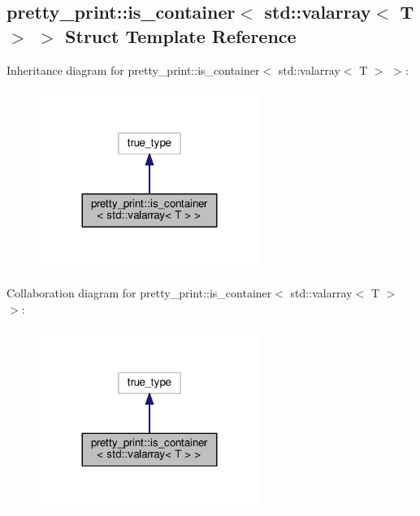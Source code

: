 \hypertarget{structpretty__print_1_1is__container_3_01std_1_1valarray_3_01T_01_4_01_4}{}\subsection{pretty\+\_\+print\+:\+:is\+\_\+container$<$ std\+:\+:valarray$<$ T $>$ $>$ Struct Template Reference}
\label{structpretty__print_1_1is__container_3_01std_1_1valarray_3_01T_01_4_01_4}


Inheritance diagram for pretty\+\_\+print\+:\+:is\+\_\+container$<$ std\+:\+:valarray$<$ T $>$ $>$\+:
\nopagebreak
\begin{figure}[H]
\begin{center}
\leavevmode
\includegraphics[width=204pt]{structpretty__print_1_1is__container_3_01std_1_1valarray_3_01T_01_4_01_4__inherit__graph}
\end{center}
\end{figure}


Collaboration diagram for pretty\+\_\+print\+:\+:is\+\_\+container$<$ std\+:\+:valarray$<$ T $>$ $>$\+:
\nopagebreak
\begin{figure}[H]
\begin{center}
\leavevmode
\includegraphics[width=204pt]{structpretty__print_1_1is__container_3_01std_1_1valarray_3_01T_01_4_01_4__coll__graph}
\end{center}
\end{figure}


